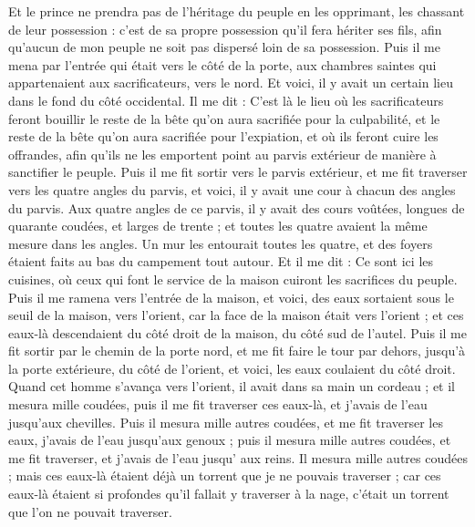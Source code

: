\begin{multicols}{2}
Et le prince ne prendra pas de l'héritage du peuple en les opprimant, les chassant de leur possession : c'est de sa propre possession qu'il fera hériter ses fils, afin qu'aucun de mon peuple ne soit pas dispersé loin de sa possession.
Puis il me mena par l'entrée qui était vers le côté de la porte, aux chambres saintes qui appartenaient aux sacrificateurs, vers le nord. Et voici, il y avait un certain lieu dans le fond du côté occidental.
Il me dit : C'est là le lieu où les sacrificateurs feront bouillir le reste de la bête qu'on aura sacrifiée pour la culpabilité, et le reste de la bête qu'on aura sacrifiée pour l'expiation, et où ils feront cuire les offrandes, afin qu'ils ne les emportent point au parvis extérieur de manière à sanctifier le peuple.
Puis il me fit sortir vers le parvis extérieur, et me fit traverser vers les quatre angles du parvis, et voici, il y avait une cour à chacun des angles du parvis.
Aux quatre angles de ce parvis, il y avait des cours voûtées, longues de quarante coudées, et larges de trente ; et toutes les quatre avaient la même mesure dans les angles.
Un mur les entourait toutes les quatre, et des foyers étaient faits au bas du campement tout autour.
Et il me dit : Ce sont ici les cuisines, où ceux qui font le service de la maison cuiront les sacrifices du peuple.
\VerseOne{}Puis il me ramena vers l'entrée de la maison, et voici, des eaux sortaient sous le seuil de la maison, vers l'orient, car la face de la maison était vers l'orient ; et ces eaux-là descendaient du côté droit de la maison, du côté sud de l'autel.
Puis il me fit sortir par le chemin de la porte nord, et me fit faire le tour par dehors, jusqu'à la porte extérieure, du côté de l'orient, et voici, les eaux coulaient du côté droit.
Quand cet homme s'avança vers l'orient, il avait dans sa main un cordeau ; et il mesura mille coudées, puis il me fit traverser ces eaux-là, et j'avais de l'eau jusqu'aux chevilles.
Puis il mesura mille autres coudées, et me fit traverser les eaux, j'avais de l'eau jusqu'aux genoux ; puis il mesura mille autres coudées, et me fit traverser, et j'avais de l'eau jusqu' aux reins.
Il mesura mille autres coudées ; mais ces eaux-là étaient déjà un torrent que je ne pouvais traverser ; car ces eaux-là étaient si profondes qu'il fallait y traverser à la nage, c'était un torrent que l'on ne pouvait traverser.

\end{multicols}
